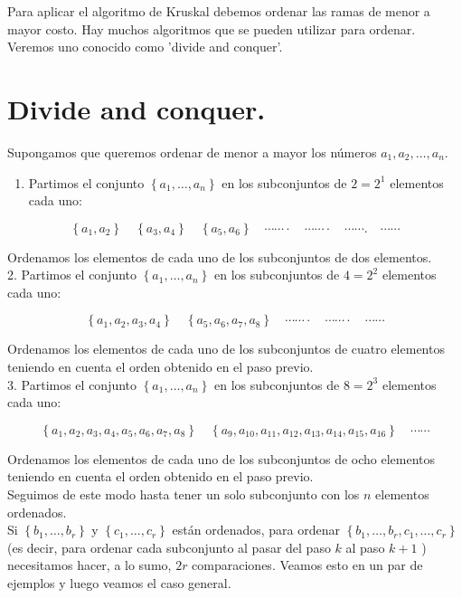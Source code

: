 \documentclass[10pt]{article}
\begin{document}
Para aplicar el algoritmo de Kruskal debemos ordenar las ramas de menor a mayor costo. Hay muchos algoritmos que se pueden utilizar para ordenar. Veremos uno conocido como 'divide and conquer'.

\section*{Divide and conquer.}
Supongamos que queremos ordenar de menor a mayor los números $a_{1}, a_{2}, \ldots, a_{n}$.

\begin{enumerate}
  \item Partimos el conjunto $\left\{a_{1}, \ldots, a_{n}\right\}$ en los subconjuntos de $2=2^{1}$ elementos cada uno:
\end{enumerate}

$$
\left\{a_{1}, a_{2}\right\} \quad\left\{a_{3}, a_{4}\right\} \quad\left\{a_{5}, a_{6}\right\} \quad \cdots \cdots \cdot \quad \cdots \cdots \cdot \quad \cdots \cdots . \quad \cdots \cdots
$$

Ordenamos los elementos de cada uno de los subconjuntos de dos elementos.\\
2. Partimos el conjunto $\left\{a_{1}, \ldots, a_{n}\right\}$ en los subconjuntos de $4=2^{2}$ elementos cada uno:

$$
\left\{a_{1}, a_{2}, a_{3}, a_{4}\right\} \quad\left\{a_{5}, a_{6}, a_{7}, a_{8}\right\} \quad \cdots \cdots \cdot \quad \cdots \cdots \cdot \quad \cdots \cdots
$$

Ordenamos los elementos de cada uno de los subconjuntos de cuatro elementos teniendo en cuenta el orden obtenido en el paso previo.\\
3. Partimos el conjunto $\left\{a_{1}, \ldots, a_{n}\right\}$ en los subconjuntos de $8=2^{3}$ elementos cada uno:

$$
\left\{a_{1}, a_{2}, a_{3}, a_{4}, a_{5}, a_{6}, a_{7}, a_{8}\right\} \quad\left\{a_{9}, a_{10}, a_{11}, a_{12}, a_{13}, a_{14}, a_{15}, a_{16}\right\} \quad \cdots \cdots
$$

Ordenamos los elementos de cada uno de los subconjuntos de ocho elementos teniendo en cuenta el orden obtenido en el paso previo.\\
Seguimos de este modo hasta tener un solo subconjunto con los $n$ elementos ordenados.\\
Si $\left\{b_{1}, \ldots, b_{r}\right\}$ y $\left\{c_{1}, \ldots, c_{r}\right\}$ están ordenados, para ordenar $\left\{b_{1}, \ldots, b_{r}, c_{1}, \ldots, c_{r}\right\}$ (es decir, para ordenar cada subconjunto al pasar del paso $k$ al paso $k+1$ ) necesitamos hacer, a lo sumo, $2 r$ comparaciones. Veamos esto en un par de ejemplos y luego veamos el caso general.
\end{document}
